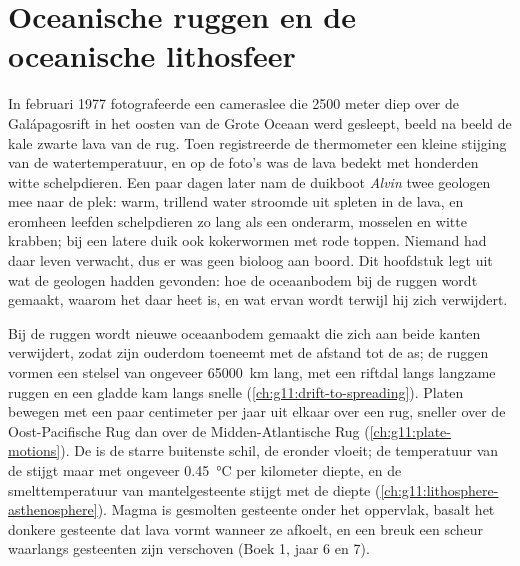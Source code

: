 \chapter{Oceanische ruggen en de oceanische lithosfeer}\label{ch:g11:ocean-ridges}

In februari 1977 fotografeerde een cameraslee die 2500 meter diep over de
Galápagosrift in het oosten van de Grote Oceaan werd gesleept, beeld na beeld de
kale zwarte lava van de rug. Toen registreerde de thermometer een kleine stijging
van de watertemperatuur, en op de foto's was de lava bedekt met honderden witte
schelpdieren. Een paar dagen later nam de duikboot \emph{Alvin} twee geologen mee
naar de plek: warm, trillend water stroomde uit spleten in de lava, en eromheen
leefden schelpdieren zo lang als een onderarm, mosselen en witte krabben; bij een
latere duik ook kokerwormen met rode toppen. Niemand had daar leven verwacht, dus
er was geen bioloog aan boord. Dit hoofdstuk legt uit wat de geologen hadden
gevonden: hoe de oceaanbodem bij de ruggen wordt gemaakt, waarom het daar heet is,
en wat ervan wordt terwijl hij zich verwijdert.

\begin{recall}
Bij de ruggen wordt nieuwe oceaanbodem gemaakt die zich aan beide kanten
verwijdert, zodat zijn ouderdom toeneemt met de afstand tot de as; de ruggen vormen
een stelsel van ongeveer \qty{65000}{km} lang, met een riftdal langs langzame ruggen
en een gladde kam langs snelle (\cref{ch:g11:drift-to-spreading}). Platen bewegen
met een paar centimeter per jaar uit elkaar over een rug, sneller over de
Oost-Pacifische Rug dan over de Midden-Atlantische Rug (\cref{ch:g11:plate-motions}).
De  is de starre buitenste schil, de  eronder vloeit; de
temperatuur van de  stijgt maar met ongeveer \qty{0.45}{\celsius} per
kilometer diepte, en de smelttemperatuur van mantelgesteente stijgt met de diepte
(\cref{ch:g11:lithosphere-asthenosphere}). Magma is gesmolten gesteente onder het
oppervlak, basalt het donkere gesteente dat lava vormt wanneer ze afkoelt, en een
breuk een scheur waarlangs gesteenten zijn verschoven (Boek 1, jaar 6 en 7).
\end{recall}

